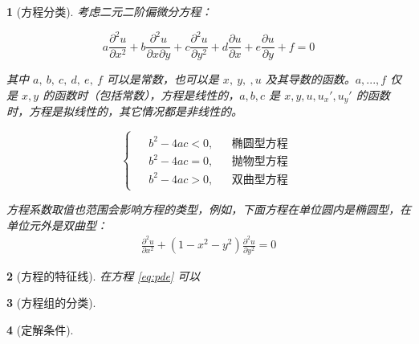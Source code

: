 \documentclass[zihao=5,UTF8]{report}
\theoremstyle{MyTheoremStyle} %
\theoremstyle{MySubsubsectionStyle} %
\newtheorem{definition}{}
\begin{document}
\begin{definition}[方程分类]
    考虑二元二阶偏微分方程：

    \begin{equation}\label{eq:pde}
        a\frac{\partial^2u}{\partial x^2}+b\frac{\partial^2u}{\partial x\partial y}+c\frac{\partial^2u}{\partial y^2}+d\frac{\partial u}{\partial x}+e\frac{\partial u}{\partial y}+f=0
    \end{equation}
    
    其中 $a,\ b,\ c,\ d,\ e,\ f$ 可以是常数，也可以是 $x,\ y,\ ,u$ 及其导数的函数。$a,...,f$ 仅是 $x,y$ 的函数时（包括常数），方程是线性的，$a,b,c$ 是 $x,y,u,u_x',u_y'$ 的函数时，方程是拟线性的，其它情况都是非线性的。
    
    \begin{equation}
        \begin{cases}
            \begin{aligned}
                &b^2 - 4ac < 0, && \text{椭圆型方程}\\ 
                &b^2 - 4ac = 0, && \text{抛物型方程}\\ 
                &b^2 - 4ac > 0, && \text{双曲型方程}
            \end{aligned}
        \end{cases}
    \end{equation}
    
    {\par\color{gray}\small
    方程系数取值也范围会影响方程的类型，例如，下面方程在单位圆内是椭圆型，在单位元外是双曲型：
    \begin{equation}
        \begin{aligned}\frac{\partial^2u}{\partial x^2}+(1-x^2-y^2)\frac{\partial^2u}{\partial y^2}=0\end{aligned}
    \end{equation}
    \par}
    
\end{definition}

\begin{definition}[方程的特征线]
    在方程 \ref*{eq:pde} 可以
\end{definition}

\begin{definition}[方程组的分类]

\end{definition}


\begin{definition}[定解条件]

\end{definition}
\end{document}
